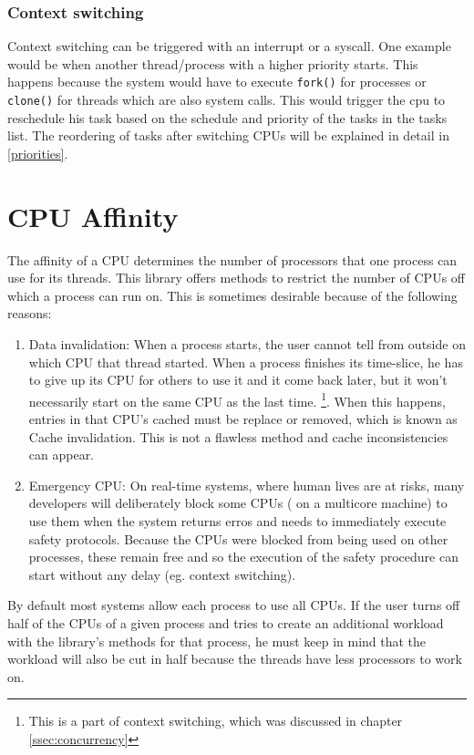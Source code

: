 \subsubsection{Context switching}
Context switching can be triggered with an interrupt or a syscall. One example would be when another thread/process with a higher priority starts. This happens because the system would have to execute \texttt{fork()} for processes or \texttt{clone()} for threads which are also system calls. This would trigger the cpu
to reschedule his task based on the schedule and priority of the tasks in the tasks list\cite{clone}.
The reordering of tasks after switching CPUs will be explained in detail in \ref{priorities}.\\ 

\section{CPU Affinity}
\label{ssec:cpu_affinity}
The affinity of a CPU determines the number of processors that one process can use for its threads.
This library offers methods to restrict the number of CPUs off which a process can run on. This is
sometimes desirable because of the following reasons:
\begin{enumerate}
	\item Data invalidation: When a process starts, the user cannot tell from outside on which CPU
	that thread started. When a process finishes its time-slice, he has to give up its CPU for
	others to use it and it come back later, but it won't necessarily start on the same CPU as the
	last time. \footnote{This is a part of context switching, which was discussed in chapter \ref{ssec:concurrency}}. When this happens, entries in that CPU's cached must be replace or removed,
	which is known as \dq Cache invalidation\dq{}. This is not a flawless method and cache inconsistencies
	can appear.
	\item Emergency CPU: On real-time systems, where human lives are at risks, many developers will
	deliberately block some CPUs ( on a multicore machine) to use them when the system returns
	erros and needs to immediately execute safety protocols. Because the CPUs were blocked
	from being used on other processes, these remain free and so the execution of the safety procedure can start without any delay (eg. context switching).
	
\end{enumerate}

By default most systems allow each process to use all CPUs. If the user turns off half of the
CPUs of a given process and tries to create an additional workload with the library's methods for that process, he must keep in
mind that the workload will also be cut in half because the threads have less processors to work on.
